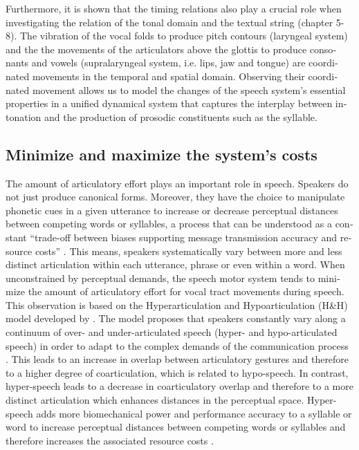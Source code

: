 \begin{otherlanguage}{english}
Furthermore, it is shown that the timing relations also play a crucial role when investigating the relation of the tonal domain and the textual string (chapter 5-8). The vibration of the vocal folds to produce pitch contours (laryngeal system) and the the movements of the articulators above the glottis to produce consonants and vowels (supralaryngeal system, i.e. lips, jaw and tongue) are coordinated movements in the temporal and spatial domain. Observing their coordinated movement allows us to model the changes of the speech system’s essential properties in a unified dynamical system that captures the interplay between intonation and the production of prosodic constituents such as the syllable.

\subsection{Minimize and maximize the system’s costs} 
\label{subsec:0802}

The amount of articulatory effort plays an important role in speech. Speakers do not just produce canonical forms. Moreover, they have the choice to manipulate phonetic cues in a given utterance to increase or decrease perceptual distances between competing words or syllables, a process that can be understood as a constant “trade-off between biases supporting message transmission accuracy and resource costs” \citep{Currie2016}. This means, speakers systematically vary between more and less distinct articulation within each utterance, phrase or even within a word. When unconstrained by perceptual demands, the speech motor system tends to minimize the amount of articulatory effort for vocal tract movements during speech. This observation is based on the Hyperarticulation and Hypoarticulation (H\&H) model developed by \citet{Lindblom1990}. The model proposes that speakers constantly vary along a continuum of over- and under-articulated speech (hyper- and hypo-articulated speech) in order to adapt to the complex demands of the communication process \citep{Liberman1985, Farnetani2010}. This leads to an increase in overlap between articulatory gestures and therefore to a higher degree of coarticulation, which is related to hypo-speech. In contrast, hyper-speech leads to a decrease in coarticulatory overlap and therefore to a more distinct articulation which enhances distances in the perceptual space. Hyper-speech adds more biomechanical power and performance accuracy to a syllable or word to increase perceptual distances between competing words or syllables and therefore increases the associated resource costs \citep[see][]{DeJong1995, Harrington2000, Cho2005a, Baese2009, Scarborough2013, Mücke2014b, Currie2016, Nelson2017}. 


\end{otherlanguage}
